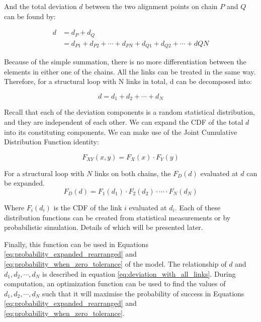 And the total deviation $d$ between the two alignment points on chain $P$ and $Q$ can be found by:

\begin{align} \label{eq:deviation_with_two_links}
    d &= d_P + d_Q \nonumber\\
      &= d_{P1} + d_{P2} + \cdots + d_{PN} + d_{Q1} + d_{Q2} + \cdots + dQN 
\end{align}

Because of the simple summation, there is no more differentiation between the elements in either one of the chains. All the links can be treated in the same way. Therefore, for a structural loop with N links in total, d can be decomposed into:

\begin{equation} \label{eq:deviation_with_all_links}
    d = d_1 + d_2 + \cdots + d_N
\end{equation}

Recall that each of the deviation components is a random statistical distribution, and they are independent of each other. We can expand the CDF of the total $d$ into its constituting components. We can make use of the Joint Cumulative Distribution Function identity:

\begin{equation}
    F_{XY}(x,y) = F_X(x) \cdot F_Y(y)
\end{equation}

For a structural loop with $N$ links on both chains, the $F_D(d)$ evaluated at $d$ can be expanded. 
\begin{equation}  \label{eq:probability_with_all_links}
    F_D(d) = F_1(d_1) \cdot F_2(d_2) \cdot \cdots \cdot F_N(d_N)
\end{equation}

Where $F_i(d_i)$ is the CDF of the link $i$ evaluated at $d_i$. Each of these distribution functions can be created from statistical measurements or by probabilistic simulation. Details of which will be presented later.

Finally, this function can be used in Equations \ref{eq:probability_expanded_rearranged} and \ref{eq:probability_when_zero_tolerance} of the model. The relationship of $d$ and $d_1, d_2, \cdots , d_N$ is described in equation \ref{eq:deviation_with_all_links}. During computation, an optimization function can be used to find the values of $d_1, d_2, \cdots , d_N$ such that it will maximise the probability of success in Equations \ref{eq:probability_expanded_rearranged} and \ref{eq:probability_when_zero_tolerance}.

